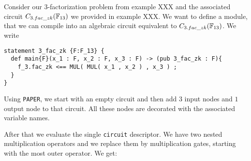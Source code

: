 \begin{example}[$3$-factorization] Consider our $3$-factorization problem from example XXX and the associated circuit $C_{3.fac\_zk}(\mathbb{F}_{13})$ we provided in example XXX. We want to define a module, that we can compile into an algebraic circuit equivalent to $C_{3.fac\_zk}(\mathbb{F}_{13})$. We write
\begin{lstlisting}
statement 3_fac_zk {F:F_13} {
  def main{F}(x_1 : F, x_2 : F, x_3 : F) -> (pub 3_fac_zk : F){
    f_3.fac_zk <== MUL( MUL( x_1 , x_2 ) , x_3 ) ;
  }
}
\end{lstlisting} 
Using \texttt{PAPER}, we start with an empty circuit and then add $3$ input nodes and $1$ output node to that circuit. All these nodes are decorated with the associated variable names. 

After that we evaluate the single \texttt{circuit} descriptor. We have two nested multiplication operators and we replace them by multiplication gates, starting with the most outer operator. We get: 
\begin{center}
\end{center}
\end{example}
